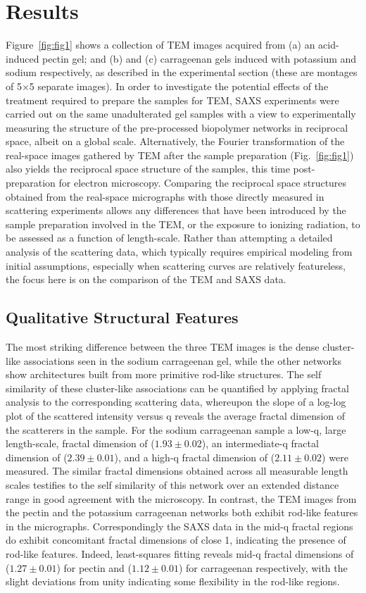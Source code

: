 \section{Results}
Figure~\ref{fig:fig1} shows a collection of TEM images acquired from (a) an acid-induced pectin gel; and (b) and (c) carrageenan gels induced with potassium and sodium respectively, as described in the experimental section (these are montages of 5$\times$5 separate images). In order to investigate the potential effects of the treatment required to prepare the samples for TEM, SAXS experiments were carried out on the same unadulterated gel samples with a view to experimentally measuring the structure of the pre-processed biopolymer networks in reciprocal space, albeit on a global scale. Alternatively, the Fourier transformation of the real-space images gathered by TEM after the sample preparation (Fig.~\ref{fig:fig1}) also yields the reciprocal space structure of the samples, this time post-preparation for electron microscopy. Comparing the reciprocal space structures obtained from the real-space micrographs with those directly measured in scattering experiments allows any differences that have been introduced by the sample preparation involved in the TEM, or the exposure to ionizing radiation, to be assessed as a function of length-scale. Rather than attempting a detailed analysis of the scattering data, which typically requires empirical modeling from initial assumptions, especially when scattering curves are relatively featureless, the focus here is on the comparison of the TEM and SAXS data.

\subsection{Qualitative Structural Features}
The most striking difference between the three TEM images is the dense cluster-like associations seen in the sodium carrageenan gel, while the other networks show architectures built from more primitive rod-like structures. The self similarity of these cluster-like associations can be quantified by applying fractal analysis to the corresponding scattering data, whereupon the slope of a log-log plot of the scattered intensity versus q reveals the average fractal dimension of the scatterers in the sample. For the sodium carrageenan sample a low-q, large length-scale, fractal dimension of ($1.93 \pm 0.02$), an intermediate-q fractal dimension of ($2.39 \pm 0.01$), and a high-q fractal dimension of ($2.11 \pm 0.02$) were measured. The similar fractal dimensions obtained across all measurable length scales testifies to the self similarity of this network over an extended distance range in good agreement with the microscopy. In contrast, the TEM images from the pectin and the potassium carrageenan networks both exhibit rod-like features in the micrographs. Correspondingly the SAXS data in the mid-q fractal regions do exhibit concomitant fractal dimensions of close 1, indicating the presence of rod-like features. Indeed, least-squares fitting reveals mid-q fractal dimensions of  ($1.27 \pm 0.01$) for pectin and ($1.12 \pm 0.01$) for carrageenan respectively, with the slight deviations from unity indicating some flexibility in the rod-like regions.    


